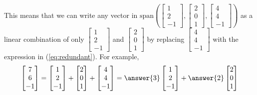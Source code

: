 \documentclass{ximera}
\begin{document}
\begin{exploration}
 This means that we can write any vector in $\mbox{span}\left(\begin{bmatrix}1\\2\\-1\end{bmatrix},\begin{bmatrix}2\\0\\1\end{bmatrix},\begin{bmatrix}4\\4\\-1\end{bmatrix}\right)$ as a linear combination of only $\begin{bmatrix}1\\2\\-1\end{bmatrix}$ and $\begin{bmatrix}2\\0\\1\end{bmatrix}$ by replacing $\begin{bmatrix}4\\4\\-1\end{bmatrix}$ with the expression in (\ref{eq:redundant}). For example, $$\begin{bmatrix}7\\6\\-1\end{bmatrix}=\begin{bmatrix}1\\2\\-1\end{bmatrix}+\begin{bmatrix}2\\0\\1\end{bmatrix}+\begin{bmatrix}4\\4\\-1\end{bmatrix}=\answer{3}\begin{bmatrix}1\\2\\-1\end{bmatrix}+\answer{2}\begin{bmatrix}2\\0\\1\end{bmatrix}$$


\end{exploration}
\end{document}

